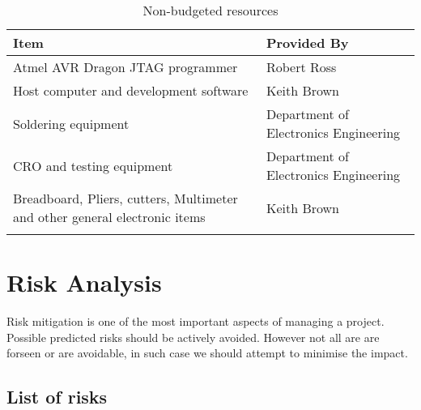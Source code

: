 \documentclass[a4paper, 11pt, twoside]{Thesis}  %
\begin{document}
\begin{table}[!h]
\centering
\begin{tabulary}{\textwidth}{LL}
\hline\hline
 Item                                                                        &  Provided By                           \\
\hline
\hline
 Atmel AVR Dragon JTAG programmer                                            &  Robert Ross                           \\
 Host computer and development software                                      &  Keith Brown                           \\
 Soldering equipment                                                         &  Department of Electronics Engineering \\
 CRO and testing equipment                                                   &  Department of Electronics Engineering \\
 Breadboard, Pliers, cutters, Multimeter and other general electronic items  &  Keith Brown                           \\
\hline
\\
\end{tabulary}
\caption{	Non-budgeted resources}
\label{1}
\end{table}


\section{Risk Analysis}

Risk mitigation is one of the most important aspects of managing a project. Possible predicted risks should be actively avoided. However not all are are forseen or are avoidable, in such case we should attempt to minimise the impact.

\subsection{List of risks}
\end{document}
